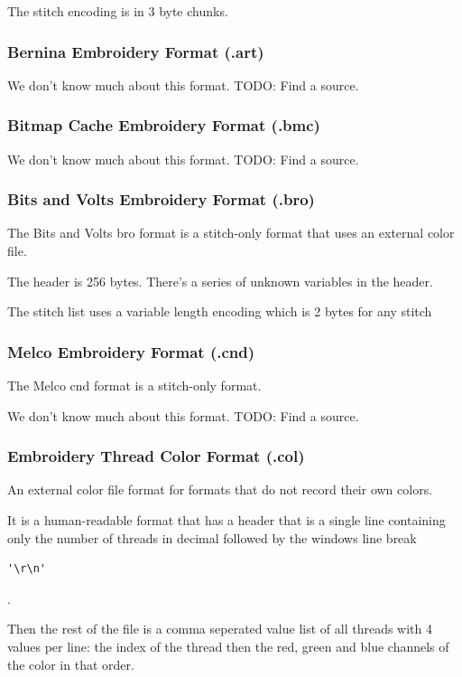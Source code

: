 \documentclass[a4paper, 11pt]{report}
\begin{document}
The stitch encoding is in 3 byte chunks.

\subsubsection{Bernina Embroidery Format (.art)}

We don't know much about this format. TODO: Find a source.

\subsubsection{Bitmap Cache Embroidery Format (.bmc)}

We don't know much about this format. TODO: Find a source.

\subsubsection{Bits and Volts Embroidery Format (.bro)}

The Bits and Volts bro format is a stitch-only format that uses an external color file.

The header is 256 bytes. There's a series of unknown variables in the
header.

The stitch list uses a variable length encoding which is 2 bytes for any
stitch

\subsubsection{Melco Embroidery Format (.cnd)}

The Melco cnd format is a stitch-only format.

We don't know much about this format. TODO: Find a source.

\subsubsection{Embroidery Thread Color Format (.col)}

An external color file format for formats that do not record their own colors. 

It is a human-readable format that has a header that is a single line containing
only the number of threads in decimal followed by the windows line break \begin{verbatim}'\r\n'\end{verbatim}.

Then the rest of the file is a comma seperated value list of all threads with
4 values per line: the index of the thread then the red, green and blue channels
of the color in that order.
\end{document}
